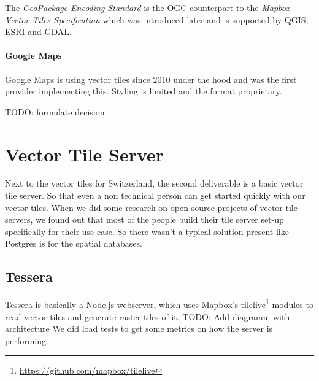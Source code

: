 The \emph{GeoPackage Encoding Standard} is the OGC counterpart to the
\emph{Mapbox Vector Tiles Specification} which was introduced later and
is supported by QGIS, ESRI and GDAL.

\paragraph{Google Maps}

Google Maps is using vector tiles since 2010 under the hood and was the
first provider implementing this. Styling is limited and the format
proprietary.

TODO: formulate decision

\section{Vector Tile Server}\label{vector_tile_server}

Next to the vector tiles for Switzerland, the second deliverable is a basic vector tile server. So that even a non technical person can get started quickly with our vector tiles.\newline{}
When we did some research on open source projects of vector tile servers, we found out that most of the people build their tile server set-up specifically for their use case. So there wasn't a typical solution present like Postgres is for the spatial databases.

\subsection{Tessera}\label{tessera}

Tessera is basically a Node.js webserver, which uses Mapbox's tilelive\footnote{\url{https://github.com/mapbox/tilelive}} modules to read vector tiles and generate raster tiles of it.
TODO: Add diagramm with architecture
We did load tests to get some metrics on how the server is performing.

